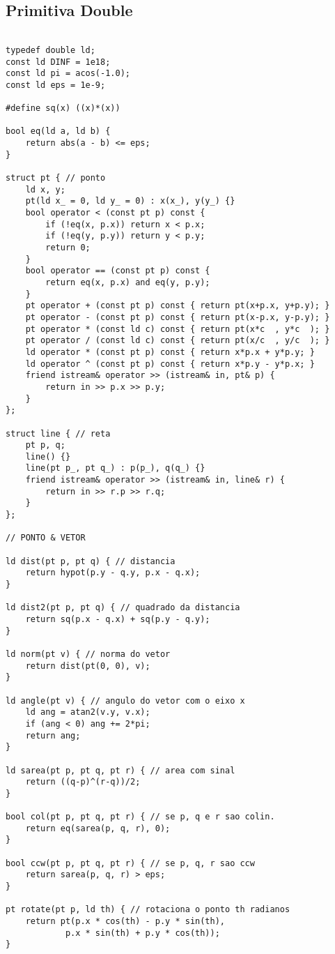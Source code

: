 \documentclass[11pt, a4paper, twoside]{article}
\begin{document}
\subsection{Primitiva Double}
\begin{verbatim}

typedef double ld;
const ld DINF = 1e18;
const ld pi = acos(-1.0);
const ld eps = 1e-9;

#define sq(x) ((x)*(x))

bool eq(ld a, ld b) {
	return abs(a - b) <= eps;
}

struct pt { // ponto
	ld x, y;
	pt(ld x_ = 0, ld y_ = 0) : x(x_), y(y_) {}
	bool operator < (const pt p) const {
		if (!eq(x, p.x)) return x < p.x;
		if (!eq(y, p.y)) return y < p.y;
		return 0;
	}
	bool operator == (const pt p) const {
		return eq(x, p.x) and eq(y, p.y);
	}
	pt operator + (const pt p) const { return pt(x+p.x, y+p.y); }
	pt operator - (const pt p) const { return pt(x-p.x, y-p.y); }
	pt operator * (const ld c) const { return pt(x*c  , y*c  ); }
	pt operator / (const ld c) const { return pt(x/c  , y/c  ); }
	ld operator * (const pt p) const { return x*p.x + y*p.y; }
	ld operator ^ (const pt p) const { return x*p.y - y*p.x; }
	friend istream& operator >> (istream& in, pt& p) {
		return in >> p.x >> p.y;
	}
};

struct line { // reta
	pt p, q;
	line() {}
	line(pt p_, pt q_) : p(p_), q(q_) {}
	friend istream& operator >> (istream& in, line& r) {
		return in >> r.p >> r.q;
	}
};

// PONTO & VETOR

ld dist(pt p, pt q) { // distancia
	return hypot(p.y - q.y, p.x - q.x);
}

ld dist2(pt p, pt q) { // quadrado da distancia
	return sq(p.x - q.x) + sq(p.y - q.y);
}

ld norm(pt v) { // norma do vetor
	return dist(pt(0, 0), v);
}

ld angle(pt v) { // angulo do vetor com o eixo x
	ld ang = atan2(v.y, v.x);
	if (ang < 0) ang += 2*pi;
	return ang;
}

ld sarea(pt p, pt q, pt r) { // area com sinal
	return ((q-p)^(r-q))/2;
}

bool col(pt p, pt q, pt r) { // se p, q e r sao colin.
	return eq(sarea(p, q, r), 0);
}

bool ccw(pt p, pt q, pt r) { // se p, q, r sao ccw
	return sarea(p, q, r) > eps;
}

pt rotate(pt p, ld th) { // rotaciona o ponto th radianos
	return pt(p.x * cos(th) - p.y * sin(th),
			p.x * sin(th) + p.y * cos(th));
}


\end{verbatim}
\end{document}
